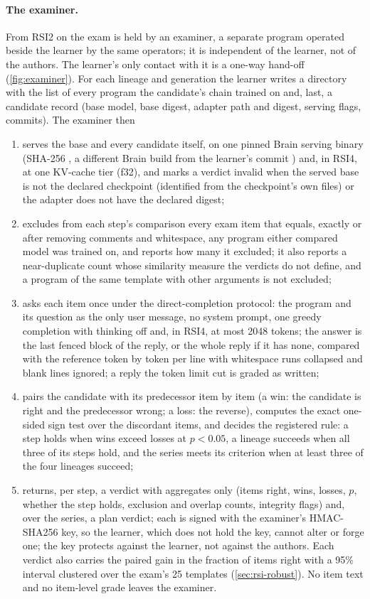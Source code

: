 \paragraph{The examiner.} From RSI2 on the exam is held by an examiner, a separate program operated
beside the learner by the same operators; it is independent of the learner, not of the authors. The
learner's only contact with it is a one-way hand-off (\cref{fig:examiner}). For each lineage and generation the learner writes a directory with
the list of every program the candidate's chain trained on and, last, a candidate record (base model,
base digest, adapter path and digest, serving flags, commits). The examiner then
\begin{enumerate}
\item serves the base and every candidate itself, on one pinned Brain serving binary (SHA-256
  , a different Brain build from the learner's commit ) and, in RSI4, at one KV-cache tier (f32), and marks a verdict invalid when the
  served base is not the declared checkpoint (identified from the checkpoint's own files) or the
  adapter does not have the declared digest;
\item excludes from each step's comparison every exam item that equals, exactly or after removing
  comments and whitespace, any program either compared model was trained on, and reports how many
  it excluded; it also reports a near-duplicate count whose similarity measure the verdicts do not
  define, and a program of the same template with other arguments is not excluded;
\item asks each item once under the direct-completion protocol: the program and its question as the
  only user message, no system prompt, one greedy completion with thinking off and, in RSI4, at most
  2048 tokens; the answer is the last fenced block of the reply, or the whole reply if it has none,
  compared with the reference token by token per line with whitespace runs collapsed and blank lines
  ignored; a reply the token limit cut is graded as written;
\item pairs the candidate with its predecessor item by item (a win: the candidate is right and the
  predecessor wrong; a loss: the reverse), computes the exact one-sided sign test over the discordant
  items, and decides the registered rule: a step holds when wins exceed losses at $p<0.05$, a lineage
  succeeds when all three of its steps hold, and the series meets its criterion when at least three of
  the four lineages succeed;
\item returns, per step, a verdict with aggregates only (items right, wins, losses, $p$, whether the
  step holds, exclusion and overlap counts, integrity flags) and, over the series, a plan verdict;
  each is signed with the examiner's HMAC-SHA256 key, so the learner, which does not hold the key,
  cannot alter or forge one; the key protects against the learner, not against the authors. Each verdict
  also carries the paired gain in the fraction of items right with a 95\% interval clustered over the
  exam's 25 templates (\cref{sec:rsi-robust}). No item text and no item-level grade leaves the
  examiner.
\end{enumerate}

